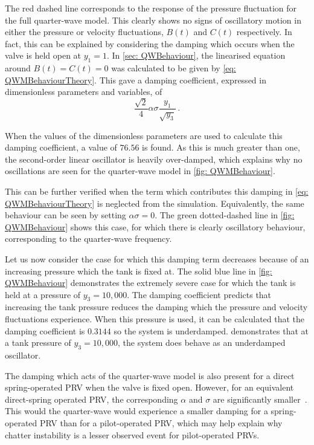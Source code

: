 The red dashed line corresponds to the response of the pressure fluctuation for the full quarter-wave model. This clearly shows no signs of oscillatory motion in either the pressure or velocity fluctuations, $B(t)$ and $C(t)$ respectively. In fact, this can be explained by considering the damping which occurs when the valve is held open at $y_1 = 1$. In \cref{sec: QWBehaviour}, the linearised equation around $B(t) = C(t) = 0$ was calculated to be given by \cref{eq: QWMBehaviourTheory}. This gave a damping coefficient, expressed in dimensionless parameters and variables, of
~
\begin{equation*}
    \frac{\sqrt{2}}{4} \alpha \sigma \frac{y_1}{\sqrt{y_3}} \, .
\end{equation*}

When the values of the dimensionless parameters are used to calculate this damping coefficient, a value of $76.56$ is found. As this is much greater than one, the second-order linear oscillator is heavily over-damped, which explains why no oscillations are seen for the quarter-wave model in \cref{fig: QWMBehaviour}.

This can be further verified when the term which contributes this damping in \cref{eq: QWMBehaviourTheory} is neglected from the simulation. Equivalently, the same behaviour can be seen by setting $\alpha \sigma = 0$. The green dotted-dashed line in \cref{fig: QWMBehaviour} shows this case, for which there is clearly oscillatory behaviour, corresponding to the quarter-wave frequency.

Let us now consider the case for which this damping term decreases because of an increasing pressure which the tank is fixed at. The solid blue line in \cref{fig: QWMBehaviour} demonstrates the extremely severe case for which the tank is held at a pressure of $y_3 = 10,000$. The damping coefficient predicts that increasing the tank pressure reduces the damping which the pressure and velocity fluctuations experience. When this pressure is used, it can be calculated that the damping coefficient is $0.3144$ so the system is underdamped.  demonstrates that at a tank pressure of $y_3 = 10,000$, the system does behave as an underdamped oscillator.

The damping which acts of the quarter-wave model is also present for a direct spring-operated PRV when the valve is fixed open. However, for an equivalent direct-spring operated PRV, the corresponding $\alpha$ and $\sigma$ are significantly smaller~\cite{Hos2015DynamicModelling}. This would the quarter-wave would experience a smaller damping for a spring-operated PRV than for a pilot-operated PRV, which may help explain why chatter instability is a lesser observed event for pilot-operated PRVs.

